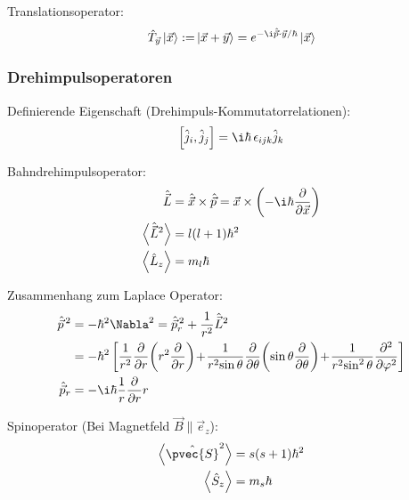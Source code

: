 \documentclass[11pt]{article}
\numberwithin{equation}{section}
\begin{document}
			\noindent
			Translationsoperator:
			\begin{equation}
				\begin{aligned}
					\hat{T}_{\vec{y}}\Ket{\vec{x}} :=& \Ket{\vec{x} + \vec{y}} = e^{-\i\hat{\vec{p}}\cdot\vec{y}/\hbar}\Ket{\vec{x}} \\
				\end{aligned}
			\end{equation}

		\subsubsection{Drehimpulsoperatoren}
			\noindent
			Definierende Eigenschaft (Drehimpuls-Kommutatorrelationen):
			\begin{equation}
				\left[ \hat{j}_i, \hat{j}_j \right] = \i\hbar\, \epsilon_{ijk} \hat{j}_k
			\end{equation}

			\noindent
			Bahndrehimpulsoperator:
			\begin{equation}
				\begin{aligned}
					\hat{\vec{L}} &= \hat{\vec{x}}\times \hat{\vec{p}} = \vec{x}\times\left(-\i\hbar\pder{}{\vec{x}}\right) \\
					\left< \hat{\vec{L}}^2 \right> &= l(l+1)\hbar^2 \\
					\left< \hat{L}_z \right> &= m_l \hbar \\
				\end{aligned}
			\end{equation}

			\noindent
			Zusammenhang zum Laplace Operator:
			\begin{equation}
				\begin{aligned}
					\hat{\vec{p}}^{\,2} &= -\hbar^2 \Nabla^2 = \hat{\vec{p}}_r^{\,2} + \frac{1}{r^2} \hat{\vec{L}}^2 \\
					&= -\hbar^2 \rBr{{\displaystyle \frac{1}{r^{2}} \frac{\partial }{\partial r}\!\left(r^{2}\frac{\partial }{\partial r}\right)\!+\!\frac{1}{r^{2}\!\sin \theta } \frac{\partial }{\partial \theta }\!\left(\sin \theta \frac{\partial }{\partial \theta }\right)\!+\!\frac{1}{r^{2}\!\sin ^{2}\theta }\frac{\partial ^{2}}{\partial \varphi ^{2}}}}\\
					\hat{\vec{p}}_r &= -\i\hbar\frac{1}{r}\pder{}{r}r \\
				\end{aligned}
			\end{equation}

			\noindent
			Spinoperator (Bei Magnetfeld $\vec{B}\parallel\vec{e}_z$):
			\begin{equation}
				\begin{aligned}
					\left<\hat{\pvec{S}}^2\right> &= s(s+1)\hbar^2 \\
					\left<\hat{S}_z\right> &= m_s \hbar \\
				\end{aligned}
			\end{equation}
\end{document}
